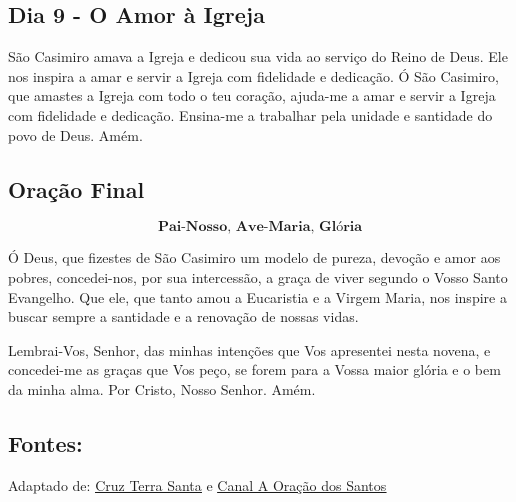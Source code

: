 \documentclass[a4paper,14pt]{extarticle} \usepackage[utf8]{inputenc}
\begin{document}
\subsection{Dia 9 - O Amor à Igreja}


\underline{}

São Casimiro amava a Igreja e dedicou sua vida ao serviço do Reino de Deus. Ele nos inspira a amar e servir a Igreja com fidelidade e dedicação.
Ó São Casimiro, que amastes a Igreja com todo o teu coração, ajuda-me a amar e servir a Igreja com fidelidade e dedicação. Ensina-me a trabalhar pela unidade e santidade do povo de Deus. Amém.


\underline{}


\subsection{Oração Final}\label{sub:final} %

\[\textbf{Pai-Nosso, Ave-Maria, Glória}\]

Ó Deus, que fizestes de São Casimiro um modelo de pureza, devoção e amor aos pobres, concedei-nos, por sua intercessão, a graça de viver segundo o Vosso Santo Evangelho. Que ele, que tanto amou a Eucaristia e a Virgem Maria, nos inspire a buscar sempre a santidade e a renovação de nossas vidas.

Lembrai-Vos, Senhor, das minhas intenções que Vos apresentei nesta novena, e concedei-me as graças que Vos peço, se forem para a Vossa maior glória e o bem da minha alma. Por Cristo, Nosso Senhor. Amém.


\vfill

\begin{center}
\subsection*{Fontes:}
Adaptado de: {\color{blue} \underline{\href{https://cruzterrasanta.com.br/historia-de-sao-casimiro/342/102/}{Cruz Terra Santa}}} e {\color{blue} \underline{\href{https://www.youtube.com/watch?v=Du2Q1R4tbYM&list=PLN7jQwkJvdQokhyBqsLItPNL4-3umDVcK&index=2}{Canal A Oração dos Santos}}}
\end{center}
\end{document}
